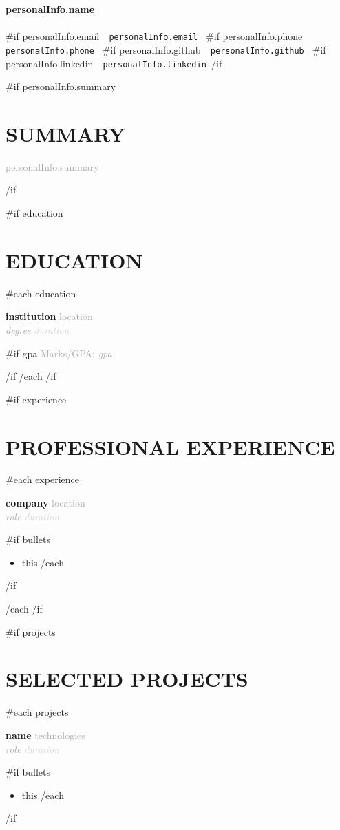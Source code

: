 \documentclass[11pt,a4paper]{article}
\newcommand{\resumeSubheading}[4]{
  \vspace{0.5em}\noindent
  \textbf{#1} \hfill \textcolor{darkgray}{#2} \\
  \textcolor{darkgray}{\textit{#3}} \hfill \textcolor{lightgray}{\textit{#4}} \par\vspace{0.3em}
}
\begin{document}
\pagestyle{empty}

{\Huge\bfseries\color{darkgray} {{{personalInfo.name}}} }\\[0.5em]
\textcolor{lightgray}{\Large }\\[1em]
{{#if personalInfo.email}}\faEnvelope\ \texttt{ {{{personalInfo.email}}} } 
{{#if personalInfo.phone}}\faPhone\ \texttt{ {{{personalInfo.phone}}} } 
{{#if personalInfo.github}}\faGithub\ \texttt{ {{{personalInfo.github}}} } 
{{#if personalInfo.linkedin}}\faLinkedin\ \texttt{ {{{personalInfo.linkedin}}} }{{/if}}

{{#if personalInfo.summary}}
\section*{SUMMARY}
\vspace{0.5em}\noindent
\textcolor{darkgray}{ {{{personalInfo.summary}}} }\par\vspace{1em}
{{/if}}

{{#if education}}
\section*{EDUCATION}
{{#each education}}
\resumeSubheading
  { {{{institution}}} }{ {{{location}}} }
  { {{{degree}}} }{ {{{duration}}} }
{{#if gpa}}
\noindent\textcolor{darkgray}{\small Marks/GPA: \textit{ {{{gpa}}} }}\par\vspace{0.3em}
{{/if}}
{{/each}}
{{/if}}

{{#if experience}}
\section*{PROFESSIONAL EXPERIENCE}
{{#each experience}}
\resumeSubheading
  { {{{company}}} }{ {{{location}}} }
  { {{{role}}} }{ {{{duration}}} }
{{#if bullets}}
  \begin{itemize}[leftmargin=*, noitemsep]
{{#each bullets}}
      \item {{{this}}}
{{/each}}
  \end{itemize}
{{/if}}

{{/each}}
{{/if}}

{{#if projects}}
\section*{SELECTED PROJECTS}
{{#each projects}}
\resumeSubheading
  { {{{name}}} }{ {{{technologies}}} }
  { {{{role}}} }{ {{{duration}}} }
{{#if bullets}}
  \begin{itemize}[leftmargin=*, noitemsep]
{{#each bullets}}
      \item {{{this}}}
{{/each}}
  \end{itemize}
{{/if}}
\end{document}
